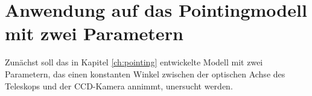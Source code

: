 \section{Anwendung auf das Pointingmodell mit zwei Parametern}
Zunächst soll das in Kapitel \ref{ch:pointing} entwickelte Modell mit zwei Parametern, das einen konstanten Winkel zwischen der optischen Achse des Teleskops und der CCD-Kamera annimmt, unersucht werden.

